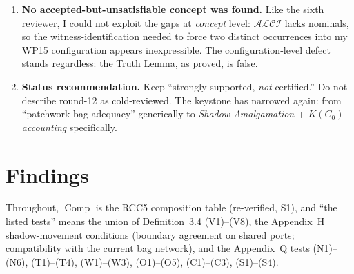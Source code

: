 \documentclass[11pt]{article}
\theoremstyle{definition}
\newcommand{\Comp}{\operatorname{Comp}}
\begin{document}
\begin{enumerate}[leftmargin=2em]
\item \textbf{No accepted-but-unsatisfiable concept was found.}  Like the
sixth reviewer, I could not exploit the gaps at \emph{concept} level:
$\mathcal{ALCI}$ lacks nominals, so the witness-identification needed to
force two distinct occurrences into my WP15 configuration appears
inexpressible.  The configuration-level defect stands regardless: the Truth
Lemma, as proved, is false.

\item \textbf{Status recommendation.}  Keep ``strongly supported,
\emph{not} certified.''  Do not describe round-12 as cold-reviewed.  The
keystone has narrowed again: from ``patchwork-bag adequacy'' generically to
\emph{Shadow Amalgamation} + \emph{$K(C_0)$ accounting} specifically.
\end{enumerate}

\section{Findings}\label{sec:findings}

Throughout, $\Comp$ is the RCC5 composition table (re-verified, S1), and
``the listed tests'' means the union of Definition~3.4 (V1)--(V8), the
Appendix~H shadow-movement conditions (boundary agreement on shared ports;
compatibility with the current bag network), and the Appendix~Q tests
(N1)--(N6), (T1)--(T4), (W1)--(W3), (O1)--(O5), (C1)--(C3), (S1)--(S4).
\end{document}
